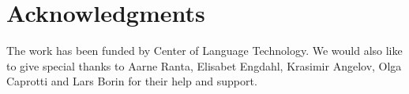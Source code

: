\documentclass[submission]{eptcs} %
\begin{document}
\section{Acknowledgments}
The work has been funded by Center of Language Technology.
We would also like to give special thanks to Aarne Ranta, %
Elisabet Engdahl, Krasimir Angelov, Olga Caprotti and Lars Borin for their help
and support.



\nocite{*}


\end{document}
